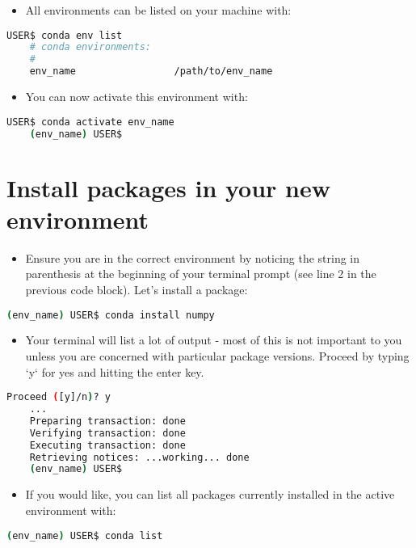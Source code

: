 \documentclass[10pt]{article}
\begin{document}
\begin{itemize}
	\item All environments can be listed on your machine with:
\end{itemize}

\begin{lstlisting}[language=bash]
	USER$ conda env list
	# conda environments:
	#
	env_name                 /path/to/env_name
\end{lstlisting}

\begin{itemize}
	\item You can now activate this environment with:
\end{itemize}


\begin{lstlisting}[language=bash]
	USER$ conda activate env_name
	(env_name) USER$ 
\end{lstlisting}

\section{Install packages in your new environment}

\begin{itemize}
	\item Ensure you are in the correct environment by noticing the string in parenthesis at the beginning of your terminal prompt (see line 2 in the previous code block). Let's install a package:
\end{itemize}

	\begin{lstlisting}[language=bash]
	(env_name) USER$ conda install numpy
\end{lstlisting}

\begin{itemize}
	\item Your terminal will list a lot of output - most of this is not important to you unless you are concerned with particular package versions. Proceed by typing `y` for yes and hitting the enter key.
\end{itemize}

\begin{lstlisting}[language=bash]
	Proceed ([y]/n)? y
	...
	Preparing transaction: done
	Verifying transaction: done
	Executing transaction: done
	Retrieving notices: ...working... done
	(env_name) USER$ 
\end{lstlisting}

\begin{itemize}
	\item If you would like, you can list all packages currently installed in the active environment with:
\end{itemize}
\begin{lstlisting}[language=bash]
	(env_name) USER$ conda list
\end{lstlisting}
\end{document}
